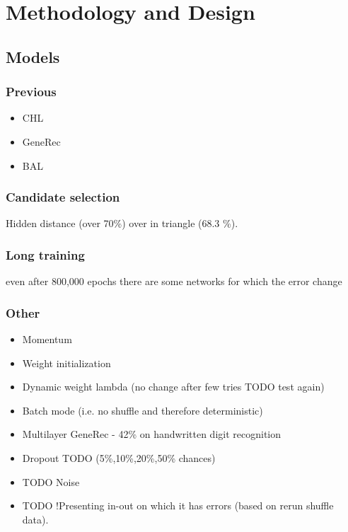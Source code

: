 
\section{Methodology and Design}

\subsection{Models}

\subsubsection{Previous} 

\begin{itemize} 
\item CHL
\item GeneRec 
\item BAL
\end{itemize}  

\subsubsection{Candidate selection} 
Hidden distance (over 70\%) over in triangle (68.3 \%). 


  
\subsubsection{Long training} 
even after 800,000 epochs there are some networks for which the error change

\subsubsection{Other} 
\begin{itemize} 
\item Momentum
\item Weight initialization 
\item Dynamic weight lambda (no change after few tries TODO test again) 
\item Batch mode (i.e. no shuffle and therefore deterministic)
\item Multilayer GeneRec - 42\% on handwritten digit recognition 
\item Dropout TODO (5\%,10\%,20\%,50\% chances)
\item TODO Noise 
\item TODO !Presenting in-out on which it has errors (based on rerun shuffle data). 
\end{itemize} 

